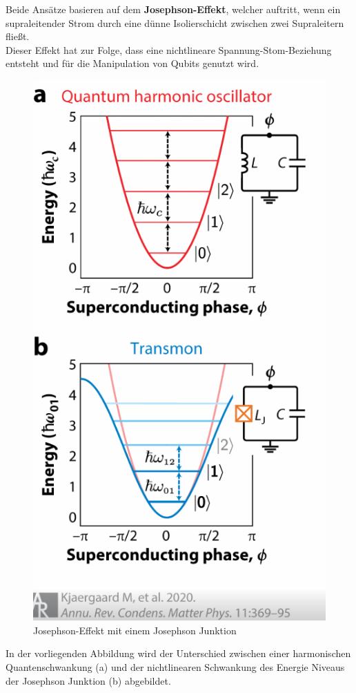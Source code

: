 Beide Ansätze basieren auf dem \textbf{Josephson-Effekt}, welcher auftritt, wenn ein supraleitender Strom durch eine dünne Isolierschicht zwischen zwei Supraleitern fließt.\\
Dieser Effekt hat zur Folge, dass eine nichtlineare Spannung-Stom-Beziehung entsteht und für die Manipulation von Qubits genutzt wird.\\

\begin{figure}[H]
    \centering
    \includegraphics[width=0.75\linewidth]{img/JJ.png}
    \caption{Josephson-Effekt mit einem Josephson Junktion}
    \label{fig:Josephson-junktion}
\end{figure}

In der vorliegenden Abbildung wird der Unterschied zwischen einer harmonischen Quantenschwankung (a) und der nichtlinearen Schwankung des Energie Niveaus der Josephson Junktion (b) abgebildet.\\

